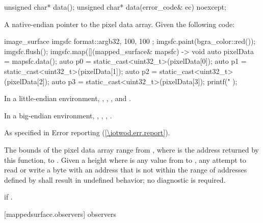 \begin{itemdecl}
unsigned char* data();
unsigned char* data(error_code& ec) noexcept;
\end{itemdecl}
\begin{itemdescr}
\pnum
\returns
A native-endian pointer to the pixel data array.
\enterexample
Given the following code:

\begin{codeblock}
image_surface imgsfc{ format::argb32, 100, 100 };
imgsfc.paint(bgra_color::red());
imgsfc.flush();
imgsfc.map([](mapped_surface& mapsfc) -> void {
    auto pixelData = mapsfc.data();
    auto p0 = static_cast<uint32_t>(pixelData[0]);
    auto p1 = static_cast<uint32_t>(pixelData[1]);
    auto p2 = static_cast<uint32_t>(pixelData[2]);
    auto p3 = static_cast<uint32_t>(pixelData[3]);
    printf("%
});
\end{codeblock}

In a little-endian environment, , , , and .

In a big-endian environment, , , , .
\exitexample

\pnum
\throws
As specified in Error reporting (\ref{\iotwod.err.report}).

\pnum
\remarks
The bounds of the pixel data array range from , where  is the address returned by this function, to . Given a height  where  is any value from  to , any attempt to read or write a byte with an address that is not within the range of addresses defined by  shall result in undefined behavior; no diagnostic is required.

\pnum
\errors
{} if .
\end{itemdescr}

 [mappedsurface.observers]{ observers}

